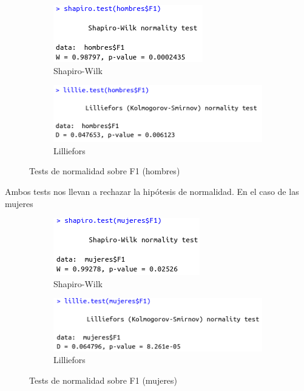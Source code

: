 \begin{figure}[H]
	\centering
	\begin{subfigure}{.5\textwidth}
		\centering
		\includegraphics[width=.6\linewidth]{swh-F1.png}
		\caption{Shapiro-Wilk}
		\label{fig:swh-F1}
	\end{subfigure}%
	\begin{subfigure}{.5\textwidth}
		\centering
		\includegraphics[width=.6\linewidth]{lh-F1.png}
		\caption{Lilliefors}
		\label{fig:lh-F1}
	\end{subfigure}
	\caption{Tests de normalidad sobre F1 (hombres)}
	\label{fig:normhF1}
\end{figure}

Ambos tests nos llevan a rechazar la hipótesis de normalidad. En el caso de las mujeres

\begin{figure}[H]
	\centering
	\begin{subfigure}{.5\textwidth}
		\centering
		\includegraphics[width=.6\linewidth]{swm-F1.png}
		\caption{Shapiro-Wilk}
		\label{fig:swm-F1}
	\end{subfigure}%
	\begin{subfigure}{.5\textwidth}
		\centering
		\includegraphics[width=.6\linewidth]{lm-F1.png}
		\caption{Lilliefors}
		\label{fig:lm-F1}
	\end{subfigure}
	\caption{Tests de normalidad sobre F1 (mujeres)}
	\label{fig:normmF1}
\end{figure}

